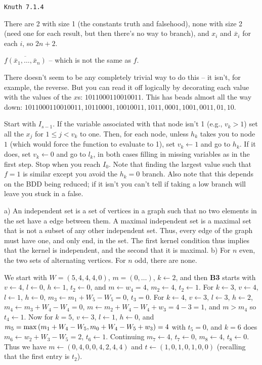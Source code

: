 \topglue 0.5in
\centerline{\tt Knuth 7.1.4}
\vskip 0.3in

 There are 2 with size 1 (the constants truth and falsehood),
none with size 2 (need one for each result, but then there's no way to branch),
and $x_i$ and $\bar x_i$ for each $i$, so $2n + 2$.

\vskip 0.08in  $\overline{f\left(\bar x_1, \ldots, \bar x_n\right)}$ --
which is not the same as $f$.

\vskip 0.08in  There doesn't seem to be any completely
trivial way to do this -- it isn't, for example, the reverse.  But you can read
it off logically by decorating each value with the values of the $x$s:
$1 0 1 1 0 0 0 1 1 0 0 1 0 0 1 1$.  This has beads almost all the way down:
$1011000110010011, 10110001, 10010011, 1011, 0001, 1001, 0011, 01, 10$. 

\vskip 0.08in  Start with $I_{s-1}$.  If the 
variable associated with that node isn't 1 (e.g., $v_k > 1$) set
all the $x_j$ for $1 \le j < v_k$ to one.  Then, for each node, unless
$h_k$ takes you to node $1$ (which would force the function to evaluate
to 1), set $v_k \gets 1$ and go to $h_k$.
If it does, set $v_k \gets 0$ and go to $l_k$, in both cases filling
in missing variables as in the first step.  Stop when you reach
$I_0$.  Note that finding the largest value such that $f=1$ is similar
except you avoid the $h_k = 0$ branch.  Also note that this depends on
the BDD being reduced; if it isn't you can't tell if taking a low branch will
leave you stuck in a false.

\vskip 0.08in  a) An independent set is a set
of vertices in a graph such that no two elements in the set have a edge
between them.  A maximal independent set is a maximal set that is
not a subset of any other independent set.  Thus, every edge of the graph must have
one, and only end, in the set. The first kernel condition thus implies that the kernel 
is independent, and the second that it is maximal.\hfil\break
b) For $n$ even, the two sets of alternating vertices.  For $n$ odd, there are none.

\vskip 0.08in  We start with
$W = \left(5, 4, 4, 4, 0\right)$, $m = \left(0, \ldots\right)$,  $k \gets 2$,
and then {\bf B3} starts with
$v \gets 4$, $l \gets 0$, $h \gets 1$, $t_2 \gets 0$, and $m \gets w_4 = 4$,
$m_2 \gets 4$, $t_2 \gets 1$.  For $k \gets 3$, $v \gets 4$, $l \gets 1$,
$h \gets 0$, $m_3 \gets m_1 + W_5 - W_5 = 0$, $t_3 = 0$.
For $k \gets 4$, $v \gets 3$, $l \gets 3$, $h \gets 2$,
$m_4 \gets m_3 + W_4 - W_4 = 0$, $m \gets m_2 + W_4 - W_4 + w_3 = 
4 - 3 = 1$, and $m > m_4$ so $t_4 \gets 1$.   Now for $k = 5$,
$v \gets 3$, $l \gets 1$, $h \gets 0$, and $m_5 = 
{\rm max}\left(m_1 + W_4 - W_5, m_0 + W_4 - W_5 + w_3\right) = 
4$ with $t_5 = 0$, and $k=6$ does $m_6 \gets w_2 + W_3 - W_5 = 2$,
$t_6 \gets 1$.  Continuing $m_7 \gets 4$, $t_7 \gets 0$, $m_8 \gets 4$,
$t_8 \gets 0$.  Thus we have $m \gets \left(0, 4, 0, 0, 4, 2, 4, 4\right)$
and $t \gets \left(1, 0, 1, 0, 1, 0, 0\right)$ (recalling that the first entry
is $t_2$).

